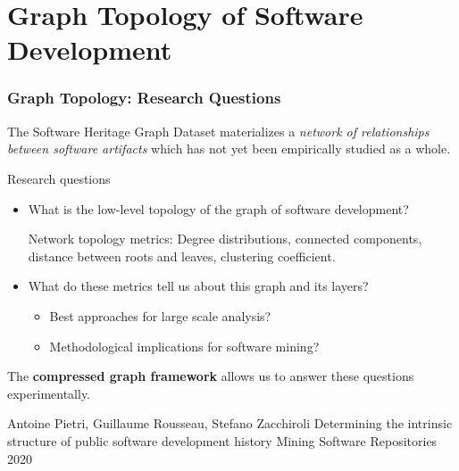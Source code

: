 \documentclass[aspectratio=169,xcolor=table]{beamer}
\begin{document}

    \section{Graph Topology of Software Development}

    \begin{frame}
        \frametitle{Graph Topology: Research Questions}

        \begin{block}{}
            The Software Heritage Graph Dataset materializes a \emph{network of
            relationships between software artifacts} which has not yet been
            empirically studied as a whole.
        \end{block}

        \begin{block}{Research questions}

            \begin{itemize}
                \item What is the low-level topology of the graph of software
                    development?

                    Network topology metrics: Degree distributions, connected
                    components, distance between roots and leaves, clustering
                    coefficient.

                \item What do these metrics tell us about this graph and its
                    layers?
                    \begin{itemize}
                \item Best approaches for large scale analysis?
                \item Methodological implications for software mining?
                    \end{itemize}
            \end{itemize}

            The \textbf{compressed graph framework} allows us to answer these
            questions experimentally.

            \footnotesize
            \begin{thebibliography}{swhforks}
                 Antoine Pietri, Guillaume Rousseau, Stefano Zacchiroli\newblock
                Determining the intrinsic structure of public software development history\newblock
                Mining Software Repositories 2020\newblock
            \end{thebibliography}
        \end{block}
    \end{frame}
\end{document}
